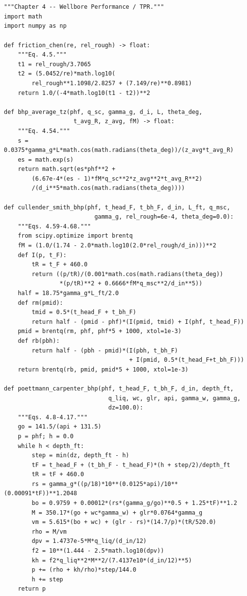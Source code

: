\documentclass[10pt,a4paper,openany]{book}
\begin{document}
\chapter{}
\begin{lstlisting}
"""Chapter 4 -- Wellbore Performance / TPR."""
import math
import numpy as np

def friction_chen(re, rel_rough) -> float:
    """Eq. 4.5."""
    t1 = rel_rough/3.7065
    t2 = (5.0452/re)*math.log10(
        rel_rough**1.1098/2.8257 + (7.149/re)**0.8981)
    return 1.0/(-4*math.log10(t1 - t2))**2

def bhp_average_tz(phf, q_sc, gamma_g, d_i, L, theta_deg,
                    t_avg_R, z_avg, fM) -> float:
    """Eq. 4.54."""
    s = 0.0375*gamma_g*L*math.cos(math.radians(theta_deg))/(z_avg*t_avg_R)
    es = math.exp(s)
    return math.sqrt(es*phf**2 +
        (6.67e-4*(es - 1)*fM*q_sc**2*z_avg**2*t_avg_R**2)
        /(d_i**5*math.cos(math.radians(theta_deg))))

def cullender_smith_bhp(phf, t_head_F, t_bh_F, d_in, L_ft, q_msc,
                          gamma_g, rel_rough=6e-4, theta_deg=0.0):
    """Eqs. 4.59-4.68."""
    from scipy.optimize import brentq
    fM = (1.0/(1.74 - 2.0*math.log10(2.0*rel_rough/d_in)))**2
    def I(p, t_F):
        tR = t_F + 460.0
        return ((p/tR)/(0.001*math.cos(math.radians(theta_deg))
                *(p/tR)**2 + 0.6666*fM*q_msc**2/d_in**5))
    half = 18.75*gamma_g*L_ft/2.0
    def rm(pmid):
        tmid = 0.5*(t_head_F + t_bh_F)
        return half - (pmid - phf)*(I(pmid, tmid) + I(phf, t_head_F))
    pmid = brentq(rm, phf, phf*5 + 1000, xtol=1e-3)
    def rb(pbh):
        return half - (pbh - pmid)*(I(pbh, t_bh_F)
                                    + I(pmid, 0.5*(t_head_F+t_bh_F)))
    return brentq(rb, pmid, pmid*5 + 1000, xtol=1e-3)

def poettmann_carpenter_bhp(phf, t_head_F, t_bh_F, d_in, depth_ft,
                              q_liq, wc, glr, api, gamma_w, gamma_g,
                              dz=100.0):
    """Eqs. 4.8-4.17."""
    go = 141.5/(api + 131.5)
    p = phf; h = 0.0
    while h < depth_ft:
        step = min(dz, depth_ft - h)
        tF = t_head_F + (t_bh_F - t_head_F)*(h + step/2)/depth_ft
        tR = tF + 460.0
        rs = gamma_g*((p/18)*10**(0.0125*api)/10**(0.00091*tF))**1.2048
        bo = 0.9759 + 0.00012*(rs*(gamma_g/go)**0.5 + 1.25*tF)**1.2
        M = 350.17*(go + wc*gamma_w) + glr*0.0764*gamma_g
        vm = 5.615*(bo + wc) + (glr - rs)*(14.7/p)*(tR/520.0)
        rho = M/vm
        dpv = 1.4737e-5*M*q_liq/(d_in/12)
        f2 = 10**(1.444 - 2.5*math.log10(dpv))
        kh = f2*q_liq**2*M**2/(7.4137e10*(d_in/12)**5)
        p += (rho + kh/rho)*step/144.0
        h += step
    return p


\end{lstlisting}
\end{document}
